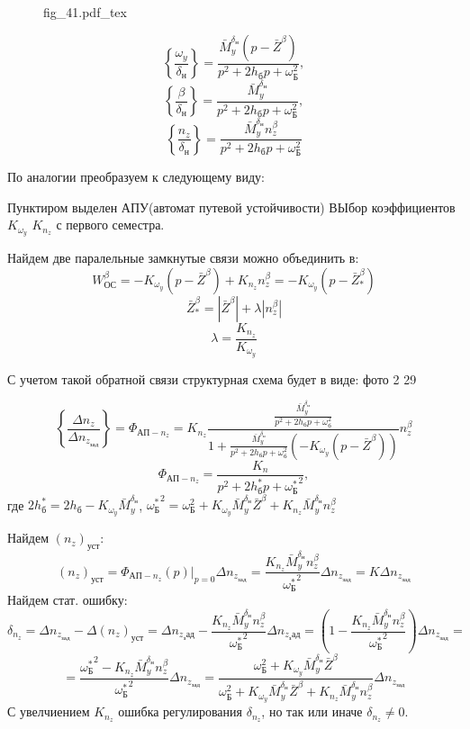 \documentclass{article}
\begin{document}
\begin{figure}[H]
    \centering
    {fig_41.pdf_tex}
\end{figure}



\[
    \left\{\frac{\omega_y}{\delta_н}\right\} = \frac{\bar{M}_y^{\delta_н}(p - \bar{Z}^\beta)}{ p^2 + 2 h_бp + \omega_Б^2 },
\]
\[
\left\{ \frac{\beta}{\delta_н} \right\} = \frac{ \bar{M}_y^{\delta_н} }{ p^2 + 2 h_бp + \omega_Б^2 }    
,\]  
\[
    \left\{ \frac{n_z}{\delta_н} \right\} = \frac{ \bar{M}_y^{\delta_н} n_z^\beta }{ p^2 + 2 h_бp + \omega_Б^2 }    
\]  

По аналогии преобразуем к следующему виду:

Пунктиром выделен АПУ(автомат путевой устойчивости) 
ВЫбор коэффициентов $K_{\omega_y}$ $K_{n_z}$ с первого семестра.

Найдем две паралельные замкнутые связи можно объединить в: 
\[
W_{ОС}^\beta = - K_{\omega_y} (p - \bar{Z}^\beta) + K_{n_z} n_z^\beta = - K_{\omega_y}(p - \bar{Z}_*^\beta)
\]
\[
\bar{Z}_*^\beta = |\bar{Z}^\beta| + \lambda |n_z^\beta|
\]
\[
    \lambda = \frac{K_{n_z}}{K_{\omega_y}} 
\]

С учетом такой обратной связи структурная схема будет в виде:
фото 2 29

\[
\left\{\frac{\Delta n_z}{\Delta n_{z_{зад}}} \right\}  = \Phi_{АП-n_z} = K_{n_z}\frac{\frac{\bar{M}_y^{\delta_н}}{p^2 + 2 h_б p + \omega_б^2}}{1 +\frac{\bar{M}_y^{\delta_н}}{p^2 + 2 h_б p + \omega_б^2} (-K_{\omega_y}(p - \bar{Z}^\beta))}n_z^\beta  
\]
\[
\Phi_{АП-n_z} =\frac{K_n}{ p^2 + 2 h_б^*p + {\omega_Б^*}^2  }, 
\]
где $2h_б^* = 2h_б - K_{\omega_y}\bar{M}_y^{\delta_н}$, ${\omega_Б^*}^2 = \omega_Б^2 + K_{\omega_y}\bar{M}_y^{\delta_н} \bar{Z}^\beta + K_{n_z} \bar{M}_y^{\delta_н} n_z^\beta $

Найдем $(n_z)_{уст}$:
\[
(n_z)_{уст} = \Phi_{АП-n_z}(p) |_{p=0} \Delta n_{z_{зад}} =\frac{K_{n_z} \bar{M}_y^{\delta_н} n_z^\beta}{{\omega_Б^*}^2} \Delta n_{z_{зад}} = K \Delta n_{z_{зад}}
\]
Найдем стат. ошибку:
\[
    \delta_{n_z} = \Delta n_{z_{зад}} - \Delta (n_z)_{уст} = \Delta n_{z_зад} - \frac{K_{n_z} \bar{M}_y^{\delta_н}n_z^\beta}{{\omega_Б^*}^2} \Delta n_{z_зад} = \left( 1 - \frac{ K_{n_z} \bar{M}_y^{\delta_н} n_z^\beta}{{\omega_Б^*}^2} \right) \Delta n_{z_{зад}} = 
\]
\[
    = \frac{{\omega_Б^*}^2 - K_{n_z} \bar{M}_y^{\delta_н} n_z^\beta}{ {\omega_Б^*}^2} \Delta n_{z_{зад}} = \frac{\omega_Б^2 + K_{\omega_y} \bar{M}_y^{\delta_н} \bar{Z}^\beta}{\omega_Б^2 + K_{\omega_y} \bar{M}_y^{\delta_н} \bar{Z}^\beta + K_{n_z} \bar{M}_y^{\delta_н} n_z^\beta} \Delta n_{z_{зад}}
\]
С увелчиением $K_{n_z}$ ошибка регулирования $\delta_{n_z}$, но так или иначе $\delta_{n_z} \neq 0$.
\end{document}
